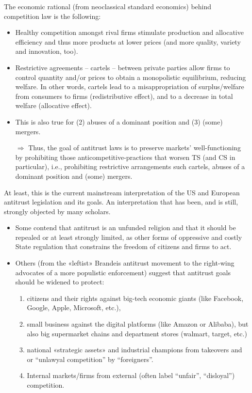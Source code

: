     The economic rational (from neoclassical standard economics) behind competition law is the following: 
    \begin{itemize}
        \item Healthy competition amongst rival firms stimulate production and allocative efficiency and thus more products at lower prices (and more quality, variety and innovation, too). 
        \item Restrictive agreements – cartels – between private parties allow firms to control quantity and/or prices to obtain a monopolistic equilibrium, reducing welfare. In other words, cartels lead to a misappropriation of surplus/welfare from consumers to firms (redistributive effect), and to a decrease in total welfare (allocative effect).
        \item This is also true for (2) abuses of a dominant position and (3) (some) mergers.
        \item[\(\Rightarrow\)] Thus, the goal of antitrust laws is to preserve markets’ well-functioning by prohibiting those anticompetitive-practices that worsen TS (and CS in particular), i.e., prohibiting restrictive arrangements such cartels, abuses of a dominant position and (some) mergers. 

    \end{itemize}

    At least, this is the current mainstream interpretation of the US and European antitrust legislation and its goals. An interpretation that has been, and is still, strongly objected by many scholars. 
    \begin{itemize}
        \item Some contend that antitrust is an unfunded religion and that it should be repealed or at least strongly limited, as other forms of oppressive and costly State regulation that constrains the freedom of citizens and firms to act. 
        \item Others (from the «leftist» Brandeis antitrust movement to the right-wing advocates of a more populistic enforcement) suggest that antitrust goals should be widened to protect: 
        \begin{enumerate}
            \item citizens and their rights against big-tech economic giants (like Facebook, Google, Apple, Microsoft, etc.), 
            \item small business against the digital platforms (like Amazon  or Alibaba), but also big supermarket chains and department stores (walmart, target, etc.)
            \item national «strategic assets» and industrial champions from takeovers and or “unlawyal competition” by “foreigners”. 
            \item Internal markets/firms from external (often label “unfair”, “disloyal”) competition.
        \end{enumerate}
    \end{itemize}

